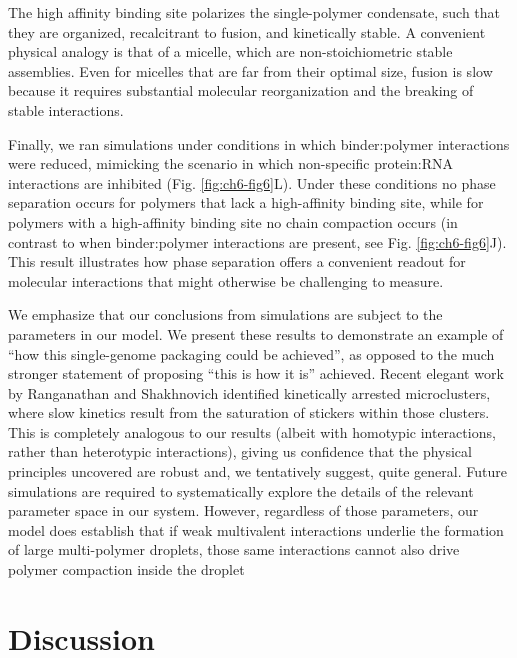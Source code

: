 \documentclass[../main.tex]{subfiles}
\begin{document}
        The high affinity binding site polarizes the single-polymer condensate, such that they are organized, recalcitrant to fusion, and kinetically stable. A convenient physical analogy is that of a micelle, which are non-stoichiometric stable assemblies. Even for micelles that are far from their optimal size, fusion is slow because it requires substantial molecular reorganization and the breaking of stable interactions\cite{Pool2007-jj,Denkova2010-ax}. 

        Finally, we ran simulations under conditions in which binder:polymer interactions were reduced, mimicking the scenario in which non-specific protein:RNA interactions are inhibited (Fig. \ref{fig:ch6-fig6}L). Under these conditions no phase separation occurs for polymers that lack a high-affinity binding site,  while for polymers with a high-affinity binding site no chain compaction occurs  (in contrast to when binder:polymer interactions are present, see Fig. \ref{fig:ch6-fig6}J). This result illustrates how phase separation offers a convenient readout for molecular interactions that might otherwise be challenging to measure. 

        We emphasize that our conclusions from simulations are subject to the parameters in our model. We present these results to demonstrate an example of “how this single-genome packaging could be achieved”, as opposed to the much stronger statement of proposing “this is how it is” achieved. Recent elegant work by Ranganathan and Shakhnovich identified kinetically arrested microclusters, where slow kinetics result from the saturation of stickers within those clusters\cite{Ranganathan2020-oo}. This is completely analogous to our results (albeit with homotypic interactions, rather than heterotypic interactions), giving us confidence that the physical principles uncovered are robust and, we tentatively suggest, quite general. Future simulations are required to systematically explore the details of the relevant parameter space in our system. However, regardless of those parameters, our model does establish that if weak multivalent interactions underlie the formation of large multi-polymer droplets, those same interactions cannot also drive polymer compaction inside the droplet


    \section{Discussion}
\end{document}
